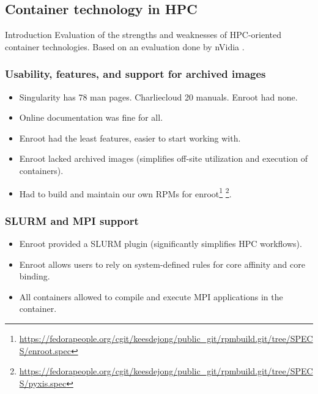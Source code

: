 \documentclass[hyperref={pdfpagelabels=false},aspectratio=169]{beamer}
\begin{document}
    \subsection{Container technology in HPC}
    \begin{frame}
    \begin{block}{Introduction}
    Evaluation of the strengths and weaknesses of HPC-oriented container technologies. Based on an evaluation done by nVidia . 
    \end{block}
    \end{frame}
    \begin{frame}
      \frametitle{Usability, features, and support for archived images}
      \begin{itemize}
        \item Singularity has 78 man pages. Charliecloud 20 manuals. Enroot had none.
        \item Online documentation was fine for all.
        \item Enroot had the least features, easier to start working with.
        \item Enroot lacked archived images (simplifies off-site utilization and execution of containers).
        \item Had to build and maintain our own RPMs for enroot\footnote{\url{https://fedorapeople.org/cgit/keesdejong/public_git/rpmbuild.git/tree/SPECS/enroot.spec}} \footnote{\url{https://fedorapeople.org/cgit/keesdejong/public_git/rpmbuild.git/tree/SPECS/pyxis.spec}}.
      \end{itemize}
    \end{frame}
    \begin{frame}
      \frametitle{SLURM and MPI support}
      \begin{itemize}
        \item Enroot provided a SLURM plugin (significantly simplifies HPC workflows).
        \item Enroot allows users to rely on system-defined rules for core affinity and core binding.
        \item All containers allowed to compile and execute MPI applications in the container.
      \end{itemize}
    \end{frame}
\end{document}
